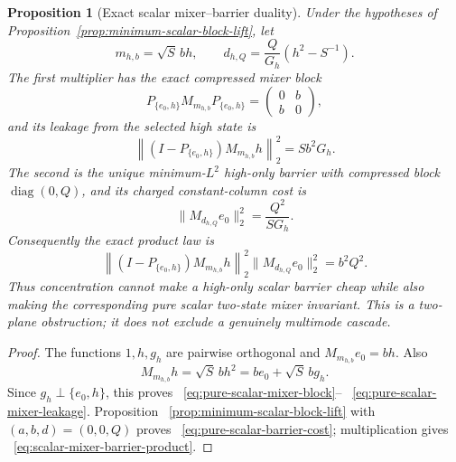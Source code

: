 \documentclass[11pt]{article}
\DeclareMathOperator{\diag}{diag}
\newtheorem{proposition}[theorem]{Proposition}
\theoremstyle{definition}
\theoremstyle{remark}
\begin{document}
\begin{proposition}[Exact scalar mixer--barrier duality]
\label{prop:scalar-mixer-barrier-duality}
Under the hypotheses of Proposition~\ref{prop:minimum-scalar-block-lift}, let
\begin{equation}
 m_{h,b}=\sqrt S\,b h,
 \qquad
 d_{h,Q}=\frac{Q}{G_h}\left(h^2-S^{-1}\right).
 \label{eq:scalar-mixer-barrier-pair}
\end{equation}
The first multiplier has the exact compressed mixer block
\begin{equation}
 P_{\{e_0,h\}}M_{m_{h,b}}P_{\{e_0,h\}}
 =\begin{pmatrix}0&b\\b&0\end{pmatrix},
 \label{eq:pure-scalar-mixer-block}
\end{equation}
and its leakage from the selected high state is
\begin{equation}
 \left\|(I-P_{\{e_0,h\}})M_{m_{h,b}}h\right\|_2^2
 =S b^2G_h.
 \label{eq:pure-scalar-mixer-leakage}
\end{equation}
The second is the unique minimum-$L^2$ high-only barrier with compressed
block $\diag(0,Q)$, and its charged constant-column cost is
\begin{equation}
 \|M_{d_{h,Q}}e_0\|_2^2=\frac{Q^2}{S G_h}.
 \label{eq:pure-scalar-barrier-cost}
\end{equation}
Consequently the exact product law is
\begin{equation}
 \left\|(I-P_{\{e_0,h\}})M_{m_{h,b}}h\right\|_2^2
 \|M_{d_{h,Q}}e_0\|_2^2=b^2Q^2.
 \label{eq:scalar-mixer-barrier-product}
\end{equation}
Thus concentration cannot make a high-only scalar barrier cheap while also
making the corresponding pure scalar two-state mixer invariant.  This is a
two-plane obstruction; it does not exclude a genuinely multimode cascade.
\end{proposition}

\begin{proof}
The functions $1,h,g_h$ are pairwise orthogonal and
$M_{m_{h,b}}e_0=bh$.  Also
\begin{equation}
 M_{m_{h,b}}h=\sqrt S\,b h^2
 =b e_0+\sqrt S\,b g_h.
\end{equation}
Since $g_h\perp\{e_0,h\}$, this proves
~\eqref{eq:pure-scalar-mixer-block}--
~\eqref{eq:pure-scalar-mixer-leakage}.  Proposition
~\ref{prop:minimum-scalar-block-lift} with $(a,b,d)=(0,0,Q)$ proves
~\eqref{eq:pure-scalar-barrier-cost}; multiplication gives
~\eqref{eq:scalar-mixer-barrier-product}.
\end{proof}
\end{document}
